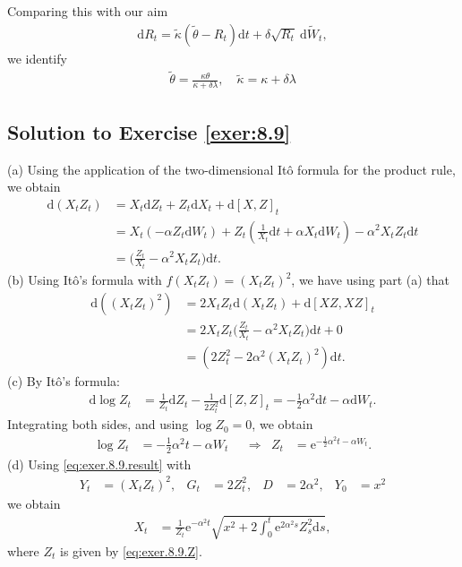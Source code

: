 \documentclass[12pt]{book}
\numberwithin{equation}{chapter}
\theoremstyle{plain}
\numberwithin{theorem}{section}
\theoremstyle{definition}
\numberwithin{exercise}{chapter}
\newcommand{\<}{\langle}
\renewcommand{\>}{\rangle}
\renewcommand{\(}{\left(}
\renewcommand{\)}{\right)}
\renewcommand{\[}{\left[}
\renewcommand{\]}{\right]}
\newcommand\dd{\mathrm{d}}
\newcommand\ee{\mathrm{e}}
\begin{document}
Comparing this with our aim \begin{align}\mathrm{d} R_{t}=\widetilde{\kappa}\left(\widetilde{\theta}-R_{t}\right) \mathrm{d} t+\delta \sqrt{R_{t}} \mathrm{~d} \widetilde{W}_{t},
\end{align} we identify
\begin{align}\widetilde{\theta}=\frac{\kappa \theta}{\kappa+\delta \lambda}, \quad \widetilde{\kappa}=\kappa+\delta \lambda
\end{align}

\subsection*{Solution to Exercise \ref{exer:8.9}}
(a) Using the application of the two-dimensional It\^o formula for the product rule, we obtain
\begin{align}
\dd (X_t Z_t)
	&=	X_t \dd Z_t+Z_t \dd X_t + \dd [X,Z]_t	\\
	&=	X_t (-\alpha Z_t \dd W_t) + Z_t (\frac{1}{X_t} \dd t + \alpha X_t \dd W_t ) - \alpha^2 X_t Z_t \dd t \\
	&= \Big( \frac{Z_t}{X_t}  - \alpha^2X_t Z_t \Big) \dd t .
\end{align}
(b) Using It\^o's formula with $f(X_t Z_t)=(X_t Z_t)^2$, we have using part (a) that
\begin{align}
\dd ((X_t Z_t)^2)
	&=	2 X_t Z_t \dd (X_t Z_t) + \dd [XZ,XZ]_t \\
	&=	2 X_t Z_t \Big( \frac{Z_t}{X_t}  - \alpha^2X_t Z_t \Big) \dd t + 0 \\
	&=	(2Z_t^2 -2\alpha^2(X_t Z_t)^2) \dd t .
\end{align}
(c) By It\^o's formula:
\begin{align}
\dd \log Z_t 
	&=	\frac{1}{Z_t}\dd Z_t - \frac{1}{2Z_t^2} \dd [Z,Z]_t = -\frac{1}{2}\alpha^2 \dd t - \alpha \dd W_t .
\end{align}
Integrating both sides, and using $\log Z_0 = 0$,  we obtain
\begin{align}
\log Z_t 
	&=	 -\frac{1}{2}\alpha^2 t - \alpha W_t &
	&\Longrightarrow&
Z_t
	&=	\ee^{-\frac{1}{2}\alpha^2t - \alpha W_t} . \label{eq:exer.8.9.Z}
\end{align}
(d) Using \eqref{eq:exer.8.9.result} with
\begin{align}
Y_t
	&=(X_t  Z_t )^2, &
G_t 
	&= 2Z_t^2, &
D 
	&= 2 \alpha^2, &
Y_0
	&=	x^2
\end{align}
we obtain
\begin{align}
X_t
	&=	\frac{1}{Z_t}\ee^{-\alpha^2 t}\sqrt{x^2 + 2\int_0^t \ee^{2\alpha^2s} Z_s^2 \dd s} ,
\end{align}
where $Z_t$ is given by \eqref{eq:exer.8.9.Z}.
\end{document}
